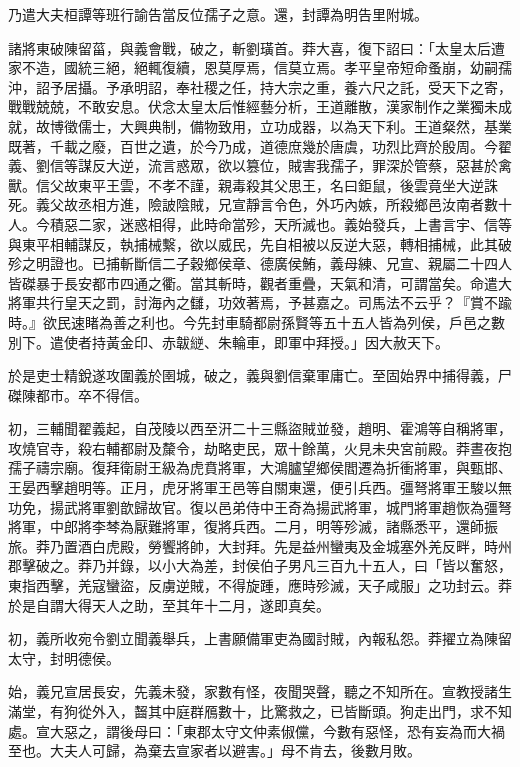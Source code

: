 \begin{pinyinscope}
乃遣大夫桓譚等班行諭告當反位孺子之意。還，封譚為明告里附城。

諸將東破陳留菑，與義會戰，破之，斬劉璜首。莽大喜，復下詔曰：「太皇太后遭家不造，國統三絕，絕輒復續，恩莫厚焉，信莫立焉。孝平皇帝短命蚤崩，幼嗣孺沖，詔予居攝。予承明詔，奉社稷之任，持大宗之重，養六尺之託，受天下之寄，戰戰兢兢，不敢安息。伏念太皇太后惟經藝分析，王道離散，漢家制作之業獨未成就，故博徵儒士，大興典制，備物致用，立功成器，以為天下利。王道粲然，基業既著，千載之廢，百世之遺，於今乃成，道德庶幾於唐虞，功烈比齊於殷周。今翟義、劉信等謀反大逆，流言惑眾，欲以篡位，賊害我孺子，罪深於管蔡，惡甚於禽獸。信父故東平王雲，不孝不謹，親毒殺其父思王，名曰鉅鼠，後雲竟坐大逆誅死。義父故丞相方進，險詖陰賊，兄宣靜言令色，外巧內嫉，所殺鄉邑汝南者數十人。今積惡二家，迷惑相得，此時命當殄，天所滅也。義始發兵，上書言宇、信等與東平相輔謀反，執捕械繫，欲以威民，先自相被以反逆大惡，轉相捕械，此其破殄之明證也。已捕斬斷信二子穀鄉侯章、德廣侯鮪，義母練、兄宣、親屬二十四人皆磔暴于長安都巿四通之衢。當其斬時，觀者重疊，天氣和清，可謂當矣。命遣大將軍共行皇天之罰，討海內之讎，功效著焉，予甚嘉之。司馬法不云乎？『賞不踰時。』欲民速睹為善之利也。今先封車騎都尉孫賢等五十五人皆為列侯，戶邑之數別下。遣使者持黃金印、赤韍縌、朱輪車，即軍中拜授。」因大赦天下。

於是吏士精銳遂攻圍義於圉城，破之，義與劉信棄軍庸亡。至固始界中捕得義，尸磔陳都巿。卒不得信。

初，三輔聞翟義起，自茂陵以西至汧二十三縣盜賊並發，趙明、霍鴻等自稱將軍，攻燒官寺，殺右輔都尉及斄令，劫略吏民，眾十餘萬，火見未央宮前殿。莽晝夜抱孺子禱宗廟。復拜衛尉王級為虎賁將軍，大鴻臚望鄉侯閻遷為折衝將軍，與甄邯、王晏西擊趙明等。正月，虎牙將軍王邑等自關東還，便引兵西。彊弩將軍王駿以無功免，揚武將軍劉歆歸故官。復以邑弟侍中王奇為揚武將軍，城門將軍趙恢為彊弩將軍，中郎將李棽為厭難將軍，復將兵西。二月，明等殄滅，諸縣悉平，還師振旅。莽乃置酒白虎殿，勞饗將帥，大封拜。先是益州蠻夷及金城塞外羌反畔，時州郡擊破之。莽乃并錄，以小大為差，封侯伯子男凡三百九十五人，曰「皆以奮怒，東指西擊，羌寇蠻盜，反虜逆賊，不得旋踵，應時殄滅，天子咸服」之功封云。莽於是自謂大得天人之助，至其年十二月，遂即真矣。

初，義所收宛令劉立聞義舉兵，上書願備軍吏為國討賊，內報私怨。莽擢立為陳留太守，封明德侯。

始，義兄宣居長安，先義未發，家數有怪，夜聞哭聲，聽之不知所在。宣教授諸生滿堂，有狗從外入，齧其中庭群鴈數十，比驚救之，已皆斷頭。狗走出門，求不知處。宣大惡之，謂後母曰：「東郡太守文仲素俶儻，今數有惡怪，恐有妄為而大禍至也。大夫人可歸，為棄去宣家者以避害。」母不肯去，後數月敗。


\end{pinyinscope}
